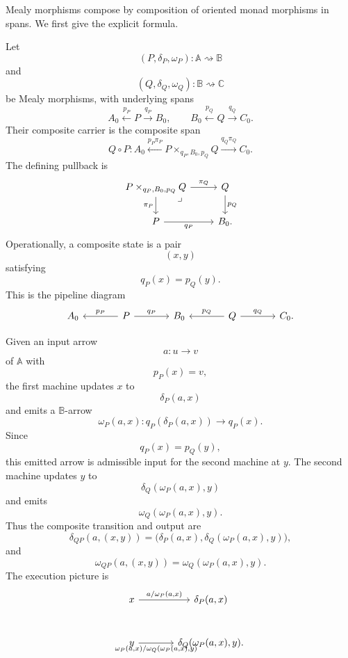 Mealy morphisms compose by composition of oriented monad morphisms in spans. We first give the explicit formula.

Let
\[
    (P,\delta_P,\omega_P):\mathbb A\rightsquigarrow\mathbb B
\]
and
\[
    (Q,\delta_Q,\omega_Q):\mathbb B\rightsquigarrow\mathbb C
\]
be Mealy morphisms, with underlying spans
\[
    A_0\xleftarrow{p_P}P\xrightarrow{q_P}B_0,
    \qquad
    B_0\xleftarrow{p_Q}Q\xrightarrow{q_Q}C_0.
\]
Their composite carrier is the composite span
\[
    Q\circ P:
    A_0
    \xleftarrow{p_P\pi_P}
    P\times_{q_P,B_0,p_Q}Q
    \xrightarrow{q_Q\pi_Q}
    C_0.
\]
The defining pullback is
\[
    \begin{tikzcd}
            P\times_{q_P,B_0,p_Q}Q
                \arrow[r, "\pi_Q"]
                \arrow[d, "\pi_P"']
                \arrow[dr, phantom, "\lrcorner", very near start]
        &
            Q   
                \arrow[d, "p_Q"]
        \\
            P 
                \arrow[r, "q_P"']
        &
            B_0.
    \end{tikzcd}
\]
Operationally, a composite state is a pair
\[
    (x,y)
\]
satisfying
\[
    q_P(x)=p_Q(y).
\]
This is the pipeline diagram
\[
    \begin{tikzcd}[column sep=large]
            A_0
        &
            P 
                \arrow[l, "p_P"'] 
                \arrow[r, "q_P"]
        &
            B_0
        &
            Q 
                \arrow[l, "p_Q"'] 
                \arrow[r, "q_Q"]
        &
            C_0.
    \end{tikzcd}
\]

Given an input arrow
\[
    a:u\to v
\]
of \(\mathbb A\) with
\[
    p_P(x)=v,
\]
the first machine updates \(x\) to
\[
    \delta_P(a,x)
\]
and emits a \(\mathbb B\)-arrow
\[
    \omega_P(a,x):q_P(\delta_P(a,x))\to q_P(x).
\]
Since
\[
    q_P(x)=p_Q(y),
\]
this emitted arrow is admissible input for the second machine at \(y\). The second machine updates \(y\) to
\[
    \delta_Q(\omega_P(a,x),y)
\]
and emits
\[
    \omega_Q(\omega_P(a,x),y).
\]
Thus the composite transition and output are
\[
    \delta_{QP}(a,(x,y))
    =
    \bigl(
    \delta_P(a,x),
    \delta_Q(\omega_P(a,x),y)
    \bigr),
\]
and
\[
    \omega_{QP}(a,(x,y))
    =
    \omega_Q(\omega_P(a,x),y).
\]
The execution picture is
\[
    \begin{tikzcd}[column sep=large, row sep=large]
            x
                \arrow[r, "{a/\omega_P(a,x)}"]
        &
            \delta_P(a,x)
        \\
            y
                \arrow[r, "{\omega_P(a,x)/\omega_Q(\omega_P(a,x),y)}"']
        &
            \delta_Q(\omega_P(a,x),y).
    \end{tikzcd}
\]

